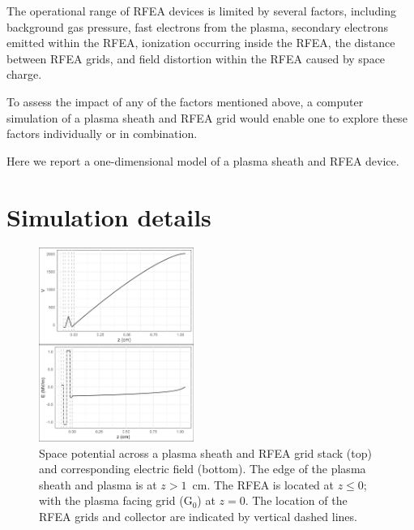 \documentclass[%
 aapm,
 mph,%
 amsmath,amssymb,
 reprint,%
]{revtex4-2}
\begin{document}
The operational range of RFEA devices is limited by several factors, including background gas pressure, fast electrons from the plasma, secondary electrons emitted within the RFEA, ionization occurring inside the RFEA, the distance between RFEA grids, and field distortion within the RFEA caused by space charge.

To assess the impact of any of the factors mentioned above, a computer simulation of a plasma sheath and RFEA grid would enable one to explore these factors individually or in combination.

Here we report a one-dimensional model of a plasma sheath and RFEA device. 

\section{\label{Simulation}Simulation details}





\begin{figure}[htbp]
    \centering
    \includegraphics[width=0.45\textwidth]{Figures/VEz2Pa13.56MHz2kVStack2332.jpeg}
    \caption{Space potential across a plasma sheath and RFEA grid stack (top) and corresponding electric field (bottom). The edge of the plasma sheath and plasma is at $z>1$~cm. The RFEA is located at $z\le0$; with the plasma facing grid (G$_0$) at $z=0$. The location of the RFEA grids and collector are indicated by vertical dashed lines.}
    \label{fig:your_label}
\end{figure}
\end{document}
